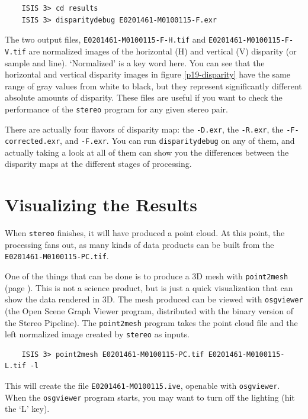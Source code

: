 \begin{verbatim}
    ISIS 3> cd results
    ISIS 3> disparitydebug E0201461-M0100115-F.exr
\end{verbatim}

\noindent
The two output files, \texttt{E0201461-M0100115-F-H.tif} and
\texttt{E0201461-M0100115-F-V.tif} are normalized images of the
horizontal (H) and vertical (V) disparity (or sample and line).
`Normalized' is a key word here.  You can see that the horizontal
and vertical disparity images in figure \ref{p19-disparity} have
the same range of gray values from white to black, but they represent
significantly different absolute amounts of disparity.  These files
are useful if you want to check the performance of the \texttt{stereo}
program for any given stereo pair.

There are actually four flavors of disparity map: the \texttt{-D.exr},
the \texttt{-R.exr}, the \texttt{-F-corrected.exr}, and \texttt{-F.exr}.
You can run \texttt{disparitydebug} on any of them, and actually taking a
look at all of them can show you the differences between the disparity maps
at the different stages of processing.

\section{Visualizing the Results}

When \texttt{stereo} finishes, it will have produced a point cloud.
At this point, the processing fans out, as many kinds of data
products can be built from the \texttt{E0201461-M0100115-PC.tif}.

One of the things that can be done is to produce a 3D mesh with
\texttt{point2mesh} (page \pageref{point2mesh}). This is not a science
product, but is just a quick visualization that can show the data
rendered in 3D. The mesh produced can be viewed with
\texttt{osgviewer} (the Open Scene Graph Viewer program, distributed
with the binary version of the Stereo Pipeline).  The
\texttt{point2mesh} program takes the point cloud file and the left
normalized image created by \texttt{stereo} as inputs.

\begin{verbatim}
    ISIS 3> point2mesh E0201461-M0100115-PC.tif E0201461-M0100115-L.tif -l
\end{verbatim}

\noindent
This will create the file \texttt{E0201461-M0100115.ive}, openable
with \texttt{osgviewer}. When the \texttt{osgviewer} program starts,
you may want to turn off the lighting (hit the `L' key).

